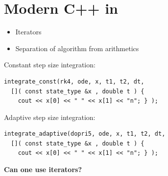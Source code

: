\section{Modern C++ in \odeint}

\begin{frame}


\vspace{4ex}

\begin{itemize}
\item Iterators
\end{itemize}
\begin{itemize}
\item Separation of algorithm from arithmetics
\end{itemize}


\end{frame}






\begin{frame}[fragile]


\vspace{3ex}
Constant step size integration:
\begin{lstlisting}
integrate_const(rk4, ode, x, t1, t2, dt,
  []( const state_type &x , double t ) {
    cout << x[0] << " " << x[1] << "n"; } );
\end{lstlisting}

\vspace{1ex}
Adaptive step size integration:
\begin{lstlisting}
integrate_adaptive(dopri5, ode, x, t1, t2, dt,
  []( const state_type &x , double t ) {
    cout << x[0] << " " << x[1] << "n"; } );
\end{lstlisting}

\vspace{2ex}
\centerline{\bf Can one use iterators?}

\end{frame}




